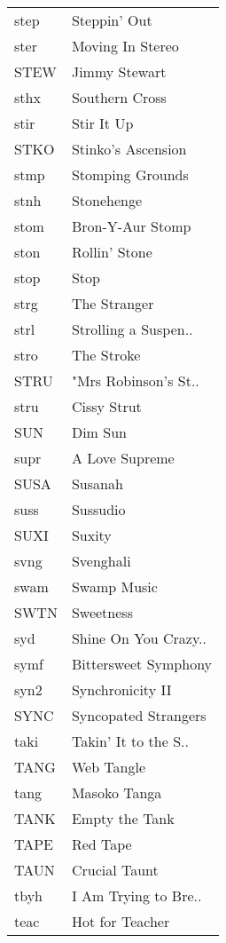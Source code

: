 \begin{supertabular}{ll}
 step &          Steppin' Out \\
 ster &      Moving In Stereo \\
 STEW &         Jimmy Stewart \\
 sthx &        Southern Cross \\
 stir &            Stir It Up \\
 STKO &    Stinko's Ascension \\
 stmp &      Stomping Grounds \\
 stnh &            Stonehenge \\
 stom &      Bron-Y-Aur Stomp \\
 ston &         Rollin' Stone \\
 stop &                  Stop \\
 strg &          The Stranger \\
 strl &  Strolling a Suspen.. \\
 stro &            The Stroke \\
 STRU &  "Mrs Robinson's St.. \\
 stru &           Cissy Strut \\
  SUN &               Dim Sun \\
 supr &        A Love Supreme \\
 SUSA &               Susanah \\
 suss &              Sussudio \\
 SUXI &                Suxity \\
 svng &             Svenghali \\
 swam &           Swamp Music \\
 SWTN &             Sweetness \\
  syd &  Shine On You Crazy.. \\
 symf &  Bittersweet Symphony \\
 syn2 &      Synchronicity II \\
 SYNC &  Syncopated Strangers \\
 taki &  Takin' It to the S.. \\
 TANG &            Web Tangle \\
 tang &          Masoko Tanga \\
 TANK &        Empty the Tank \\
 TAPE &              Red Tape \\
 TAUN &         Crucial Taunt \\
 tbyh &  I Am Trying to Bre.. \\
 teac &       Hot for Teacher \\

\end{supertabular}
